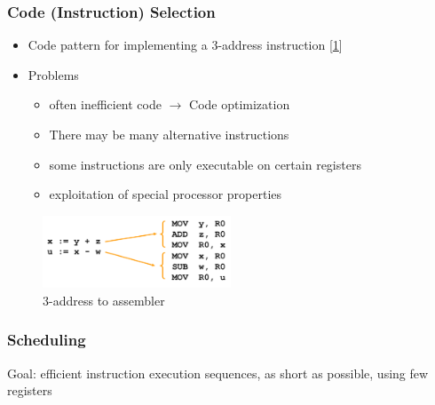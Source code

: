 \subsubsection{Code (Instruction) Selection}
\begin{itemize}
	\item Code pattern for implementing a 3-address instruction [\cref{fig:3-addres_to_assembler}]
	\item Problems
\begin{itemize}
	\item often inefficient code $\rightarrow$ Code optimization
	\item There may be many alternative instructions
	\item some instructions are only executable on certain registers
	\item exploitation of special processor properties   
\end{itemize}
\end{itemize}

\begin{figure}[h]
	\begin{center}
		\includegraphics[width=0.5\textwidth]{images/Code_selection.png}
		\caption{3-address to assembler}
		\label{fig:3-addres_to_assembler}
	\end{center}
\end{figure}

\subsubsection{Scheduling}
Goal: efficient instruction execution sequences, as short as possible, using few registers

